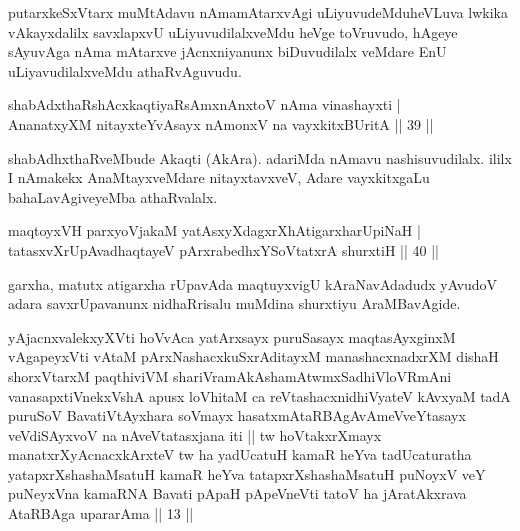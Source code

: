 \begin{artha}
putarxkeSxVtarx muMtAdavu nAmamAtarxvAgi uLiyuvudeMdu\break heVLuva lwkika vAkayxdalilx savxlapxvU uLiyuvudilalxveMdu heVge toVruvudo, hAgeye sAyuvAga nAma mAtarxve jAcnxniyanunx biDuvudilalx veMdare EnU uLiyavudilalxveMdu athaRvAguvudu.
\end{artha}


\begin{shl}
shabAdxthaRshAcx\s \s kaqtiyaRsAmxnAnxtoV nAma vinashayxti |\\
AnanatxyXM nitayxteYvAsayx nAmonxV na vayxkitxBUritA \hfill || 39 ||
\end{shl}

\begin{artha}
shabAdhxthaRveMbude Akaqti (AkAra). adariMda nAmavu nashisuvudilalx. ililx I nAmakekx AnaMtayxveMdare nitayxtavxveV, Adare vayxkitxgaLu bahaLavAgiveyeMba athaRvalalx.
\end{artha}


\begin{shl}
maqtoyxVH parxyoVjakaM yatAsxyXdagxrXhAtigarxharUpiNaH |\\
tatasxvXrUpAvadhaqtayeV pArxrabedhxYSoVtatxrA shurxtiH \hfill || 40 ||
\end{shl}

\begin{artha}
garxha, matutx atigarxha rUpavAda maqtuyxvigU kAraNavAdadudx yAvudoV adara savxrUpavanunx nidhaRrisalu muMdina shurxtiyu AraMBavAgide.
\end{artha}


\begin{kandikeshl}
yAjacnxvalekxyXVti hoVvAca yatArxsayx puruSasayx maqtasAyxginxM vAgapeyxVti vAtaM pArxNashacxkuSxrAditayxM manashacxnadxrXM dishaH shorxVtarxM paqthiviVM shariVramAkAshamAtwmxSadhiVloVRmAni vanasapxtiVnekxVshA apusx loVhitaM ca reVtashacx\break nidhiVyateV kAvxyaM tadA puruSoV BavatiVtAyxhara soVmayx hasatxmAtaRBAgAvAmeVveYtasayx veVdiSAyxvoV na nAveVtatasxjana iti || tw hoVtakxrXmayx manatxrXyAcnacxkArxteV tw ha yadUcatuH kamaR heYva tadUcaturatha yatapxrXshashaMsatuH kamaR heYva tatapxrXshashaMsatuH puNoyxV veY puNeyxVna kamaRNA Bavati pApaH pApeVneVti tatoV ha jAratAkxrava AtaRBAga upararAma || 13 ||
\end{kandikeshl}

